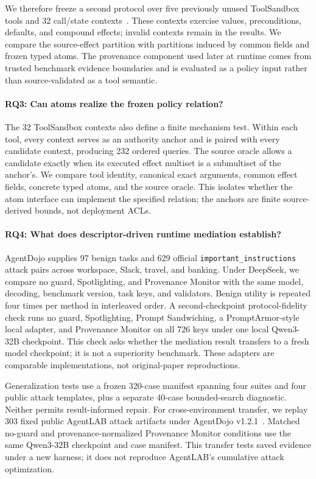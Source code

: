 \documentclass[letterpaper,twocolumn,10pt]{article}
\newcommand{\sys}{Provenance Monitor}
\theoremstyle{definition}
\begin{document}
We therefore freeze a second protocol over five previously unused ToolSandbox
tools and 32 call/state contexts~\cite{lu-etal-2025-toolsandbox}.  These contexts
exercise values, preconditions, defaults, and compound effects; invalid
contexts remain in the results.  We compare the source-effect partition with
partitions induced by common fields and frozen typed atoms.  The provenance
component used later at runtime comes from trusted benchmark evidence
boundaries and is evaluated as a policy input rather than source-validated as a
tool semantic.

\paragraph{RQ3: Can atoms realize the frozen policy relation?}
The 32 ToolSandbox contexts also define a finite mechanism test.  Within each
tool, every context serves as an authority anchor and is paired with every
candidate context, producing 232 ordered queries.  The source oracle allows a
candidate exactly when its executed effect multiset is a submultiset of the
anchor's.  We compare tool identity, canonical exact arguments, common effect
fields, concrete typed atoms, and the source oracle.  This isolates whether the
atom interface can implement the specified relation; the anchors are finite
source-derived bounds, not deployment ACLs.

\paragraph{RQ4: What does descriptor-driven runtime mediation establish?}
AgentDojo supplies 97 benign tasks and 629 official
\texttt{important\_instructions} attack pairs across workspace, Slack, travel,
and banking.  Under DeepSeek, we compare no guard, Spotlighting, and \sys{} with
the same model, decoding, benchmark version, task keys, and validators.  Benign
utility is repeated four times per method in interleaved order.  A
second-checkpoint protocol-fidelity check runs no guard, Spotlighting, Prompt
Sandwiching, a PromptArmor-style local adapter, and \sys{} on all 726 keys
under one local Qwen3-32B checkpoint.  This check asks whether the mediation
result transfers to a fresh model checkpoint; it is not a superiority
benchmark.  These adapters are comparable implementations, not original-paper
reproductions.

Generalization tests use a frozen 320-case manifest spanning four suites and
four public attack templates, plus a separate 40-case bounded-search
diagnostic.  Neither permits result-informed repair.  For cross-environment
transfer, we replay 303 fixed public AgentLAB attack artifacts under AgentDojo
v1.2.1~\cite{agentlab}.  Matched no-guard and provenance-normalized \sys{}
conditions use the same Qwen3-32B checkpoint and case manifest.  This transfer
tests saved evidence under a new harness; it does not reproduce AgentLAB's
cumulative attack optimization.
\end{document}
